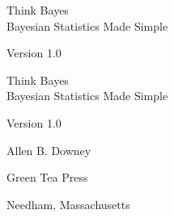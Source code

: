 \documentclass[12pt]{book}
\newcommand{\theversion}{1.0}
\begin{document}
\begin{latexonly}

\renewcommand{\blankpage}{\thispagestyle{empty} \quad \newpage}


\thispagestyle{empty}

\begin{flushright}
\vspace*{2.0in}

\begin{spacing}{3}
{\huge Think Bayes}\\
{\Large Bayesian Statistics Made Simple}
\end{spacing}

\vspace{0.25in}

Version \theversion

\vfill

\end{flushright}


\blankpage
\blankpage

\pagebreak
\thispagestyle{empty}

\begin{flushright}
\vspace*{2.0in}

\begin{spacing}{3}
{\huge Think Bayes}\\
{\Large Bayesian Statistics Made Simple}
\end{spacing}

\vspace{0.25in}

Version \theversion

\vspace{1in}


{\Large
Allen B. Downey\\
}


\vspace{0.5in}

{\Large Green Tea Press}

{\small Needham, Massachusetts}

\vfill

\end{flushright}


\pagebreak
\thispagestyle{empty}


\end{latexonly}
\end{document}
